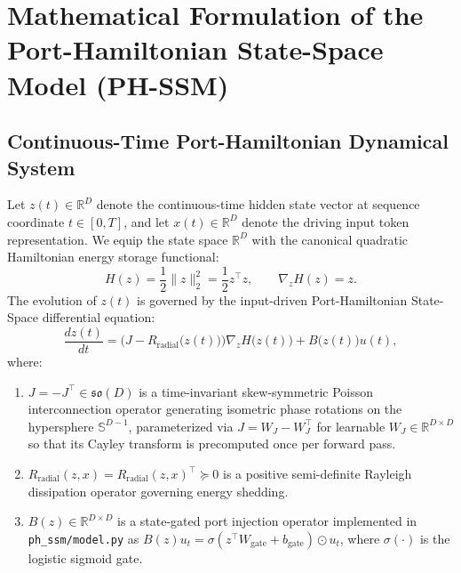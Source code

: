 \documentclass[11pt,a4paper]{article}
\begin{document}
\section[Mathematical Formulation of PH-SSM]{Mathematical Formulation of the Port-Hamiltonian State-Space Model (PH-SSM)}
\label{sec:ph_ssm}

\subsection{Continuous-Time Port-Hamiltonian Dynamical System}
Let $z(t) \in \mathbb{R}^D$ denote the continuous-time hidden state vector at sequence coordinate $t \in [0, T]$, and let $x(t) \in \mathbb{R}^D$ denote the driving input token representation. We equip the state space $\mathbb{R}^D$ with the canonical quadratic Hamiltonian energy storage functional:
\begin{equation}
    H(z) = \frac{1}{2}\|z\|_2^2 = \frac{1}{2} z^\top z, \qquad \nabla_z H(z) = z.
    \label{eq:hamiltonian_energy}
\end{equation}
The evolution of $z(t)$ is governed by the input-driven Port-Hamiltonian State-Space differential equation:
\begin{equation}
    \frac{dz(t)}{dt} = \Big( J - R_{\text{radial}}\big(z(t)\big) \Big) \nabla_z H\big(z(t)\big) + B\big(z(t)\big) u(t),
    \label{eq:ph_ssm_ode}
\end{equation}
where:
\begin{enumerate}
    \item $J = -J^\top \in \mathfrak{so}(D)$ is a time-invariant skew-symmetric Poisson interconnection operator generating isometric phase rotations on the hypersphere $\mathbb{S}^{D-1}$, parameterized via $J = W_J - W_J^\top$ for learnable $W_J \in \mathbb{R}^{D\times D}$ so that its Cayley transform is precomputed once per forward pass.
    \item $R_{\text{radial}}(z, x) = R_{\text{radial}}(z, x)^\top \succeq 0$ is a positive semi-definite Rayleigh dissipation operator governing energy shedding.
    \item $B(z) \in \mathbb{R}^{D\times D}$ is a state-gated port injection operator implemented in \texttt{ph\_ssm/model.py} as $B(z)u_t = \sigma(z^\top W_{\text{gate}} + b_{\text{gate}}) \odot u_t$, where $\sigma(\cdot)$ is the logistic sigmoid gate.
\end{enumerate}
\end{document}
